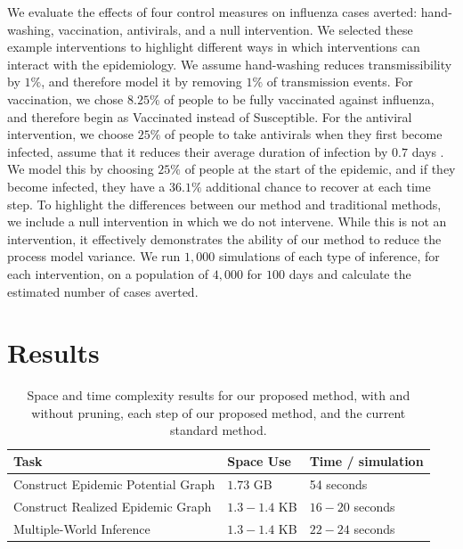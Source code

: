 \documentclass[PTRSB]{rsos}
\begin{document}
\begin{multicols}{2}
We evaluate the effects of four control measures on influenza cases averted: hand-washing, vaccination, antivirals, and a null intervention.
We selected these example interventions to highlight different ways in which interventions can interact with the epidemiology.
We assume hand-washing reduces transmissibility by $1\%$, and therefore model it by removing $1\%$ of transmission events.
For vaccination, we chose $8.25\%$ of people to be fully vaccinated against influenza, and therefore begin as Vaccinated instead of Susceptible.
For the antiviral intervention, we choose $25\%$ of people to take antivirals when they first become infected, assume that it reduces their average duration of infection by $0.7$ days \cite{oseltamivir:2014}.
We model this by choosing $25\%$ of people at the start of the epidemic, and if they become infected, they have a $36.1\%$ additional chance to recover at each time step.
To highlight the differences between our method and traditional methods, we include a null intervention in which we do not intervene.
While this is not an intervention, it effectively demonstrates the ability of our method to reduce the process model variance.
We run $1,000$ simulations of each type of inference, for each intervention, on a population of $4,000$ for $100$ days and calculate the estimated number of cases averted.

\section{Results}

\begin{table}
\caption{Space and time complexity results for our proposed method, with and without pruning, each step of our proposed method, and the current standard method.}
\begin{tabular}{|l|l|l|}
  \hline
  Task & Space Use & Time / simulation\\\hline
  Construct Epidemic Potential Graph& $1.73$ GB & 54 seconds \\\hline
  Construct Realized Epidemic Graph& $1.3-1.4$ KB & $16-20$ seconds \\\hline
  Multiple-World Inference& $1.3-1.4$ KB &  $22-24$ seconds\\\hline
\end{tabular}
\label{table:performance}
\end{table}


\end{multicols}
\end{document}
